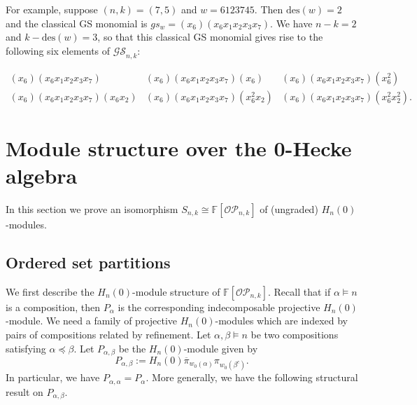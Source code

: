 \documentclass[ALCO,ThmDefs,published]{cedram}
\newcommand{\FF}{{\mathbb{F}}}
\theoremstyle{plain}
\newcommand{\des}{{\mathrm {des}}}
\newcommand{\OP}{{\mathcal{OP}}}
\newcommand{\FF}{{\mathbb{F}}}
\newcommand{\GS}{{\mathcal{GS}}}
\newcommand{\pib}{\overline{\pi}}
\begin{document}
For example, suppose $(n,k) = (7,5)$ and $w = 6123745$.  Then $\des(w) = 2$ and the classical
GS monomial is
$gs_w = (x_6)(x_6 x_1 x_2 x_3 x_7)$.
We have $n-k = 2$ and $k - \des(w) = 3$, so that this classical GS monomial gives rise to the following six elements of
$\GS_{n,k}$:
\begin{center}
$\begin{array}{ccc}
(x_6)(x_6 x_1 x_2 x_3 x_7) & (x_6)(x_6 x_1 x_2 x_3 x_7)(x_6) & (x_6)(x_6 x_1 x_2 x_3 x_7)(x_6^2) \\
(x_6)(x_6 x_1 x_2 x_3 x_7) (x_6 x_2) & (x_6)(x_6 x_1 x_2 x_3 x_7) (x_6^2 x_2) &
(x_6)(x_6 x_1 x_2 x_3 x_7) (x_6^2 x_2^2).
\end{array}$
\end{center}








\section{Module structure over the 0-Hecke algebra}
\label{Module}

In this section we prove  an isomorphism $S_{n,k} \cong \FF[\OP_{n,k}]$ of (ungraded) $H_n(0)$-modules.

\subsection{Ordered set partitions}
\label{osp}
We first describe the $H_n(0)$-module structure of $\FF[\OP_{n,k}]$.
Recall that if $\alpha \models n$ is a composition, then $P_{\alpha}$ is the corresponding 
indecomposable projective $H_n(0)$-module.
We need a family of projective $H_n(0)$-modules which are indexed by pairs of compositions related by refinement.
Let $\alpha, \beta \models n$ be two compositions satisfying $\alpha \preceq \beta$.
Let $P_{\alpha,\beta}$ be the $H_n(0)$-module given by
\begin{equation}\label{P-alpha-beta}
P_{\alpha,\beta} := H_n(0) \pib_{w_0(\alpha)} \pi_{w_0(\beta^c)}.
\end{equation}
In particular, we have $P_{\alpha,\alpha} = P_{\alpha}$.
More generally, we have the following structural result on $P_{\alpha,\beta}$.
\end{document}
